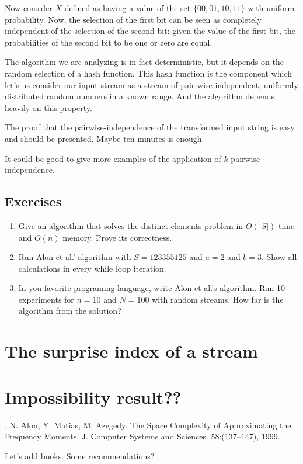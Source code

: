 \documentclass[12pt]{article}
\begin{document}
Now consider $X$ defined as having a value of the set $\{00,01,10,11\}$ with uniform probability. Now, the selection of the first bit can be seen as completely independent of the selection of the second bit: given the value of the first bit, the probabilities  of the second bit to be one or zero are equal.

The algorithm we are analyzing is in fact deterministic, but it depends on the random selection of a hash function. This hash function is the component which let's us consider our input stream as a stream of pair-wise independent, uniformly distributed random numbers in a known range. And the algorithm depends heavily on this property.

The proof that the pairwise-independence of the transformed input string is easy and should be presented. Maybe ten minutes is enough.
 
It could be good to give more examples of the application of $k$-pairwise independence.




\subsection{Exercises}


\begin{enumerate}

\item Give an algorithm that solves the distinct elements problem in $O(|S|)$ time
and $O(n)$ memory. Prove its correctness.

\item Run Alon et al.' algorithm with $S = 1 2 3 3 5 5 1 2 5$ and $a=2$ and $b=3$.
Show all calculations in every while loop iteration.

\item In you favorite programing language, write Alon et al.'s algorithm. 
Run 10 experiments for $n=10$ and $N=100$ with random streams.
How far is the algorithm from the solution?  
\end{enumerate}



\section{The surprise index of a stream}



\section{Impossibility result??}



\begin{thebibliography}{XXX}

 . N. Alon, Y. Matias, M. Azegedy. The Space Complexity of Approximating the Frequency Moments. J. Computer Systems and Sciences. 58:(137--147), 1999.

Let's add books. Some recommendations?

\end{thebibliography}
\end{document}
